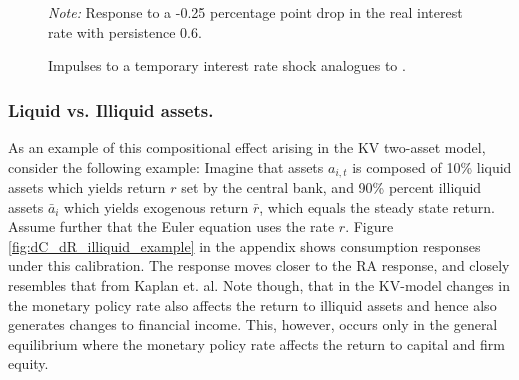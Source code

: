 \begin{figure}[H]
\caption{Impulses to a temporary interest rate shock analogues to \citet{kaplan2018monetary}.}
\label{fig:calibration_C_r}
    \scriptsize
    \centering
    {
    \emph{Note:} Response to a -0.25 percentage point drop in the real interest rate with persistence 0.6. }
\end{figure}


\subsubsection{Liquid vs. Illiquid assets.} As an example of this compositional effect arising in the KV two-asset model, consider the following example: Imagine that assets $a_{i,t}$ is composed of 10\% liquid assets which yields return $r$ set by the central bank, and 90\% percent illiquid assets $\bar{a}_i$ which yields exogenous return $\bar{r}$, which equals the steady state return. Assume further that the Euler equation uses the rate $r$. Figure \ref{fig:dC_dR_illiquid_example} in the appendix shows consumption responses under this calibration. The response moves closer to the RA response, and closely resembles that from Kaplan et. al. Note though, that in the KV-model changes in the monetary policy rate also affects the return to illiquid assets and hence also generates changes to financial income. This, however, occurs only in the general equilibrium where the monetary policy rate affects the return to capital and firm equity. 




